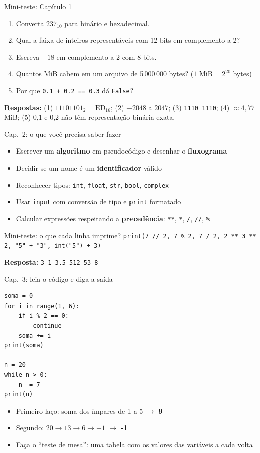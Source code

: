 \documentclass[aspectratio=169,10pt,t]{beamer}
\begin{document}
\begin{frame}{Mini-teste: Capítulo 1}
  \begin{enumerate}
    \item Converta \(237_{10}\) para binário e hexadecimal.
    \item Qual a faixa de inteiros representáveis com 12 bits em complemento a 2?
    \item Escreva \(-18\) em complemento a 2 com 8 bits.
    \item Quantos MiB cabem em um arquivo de 5\,000\,000 bytes? (\(1\text{ MiB}=2^{20}\) bytes)
    \item Por que \texttt{0.1 + 0.2 == 0.3} dá \texttt{False}?
  \end{enumerate}
  \vspace{1ex}
  \small\textbf{Respostas:} (1) \(11101101_2=\text{ED}_{16}\); (2) \(-2048\) a \(2047\); (3) \texttt{1110 1110}; (4) \(\approx 4{,}77\) MiB; (5) 0,1 e 0,2 não têm representação binária exata.
\end{frame}

\begin{frame}{Cap.~2: o que você precisa saber fazer}
  \begin{itemize}
    \item Escrever um \textbf{algoritmo} em pseudocódigo e desenhar o \textbf{fluxograma}
    \item Decidir se um nome é um \textbf{identificador} válido
    \item Reconhecer tipos: \texttt{int}, \texttt{float}, \texttt{str}, \texttt{bool}, \texttt{complex}
    \item Usar \texttt{input} com conversão de tipo e \texttt{print} formatado
    \item Calcular expressões respeitando a \textbf{precedência}: \texttt{**}, \texttt{*}, \texttt{/}, \texttt{//}, \texttt{\%}
  \end{itemize}
  \begin{block}{Mini-teste: o que cada linha imprime?}
    \texttt{print(7 // 2, 7 \% 2, 7 / 2, 2 ** 3 ** 2, "5" + "3", int("5") + 3)}
  \end{block}
  \small \textbf{Resposta:} \texttt{3 1 3.5 512 53 8}
\end{frame}

\begin{frame}[fragile]{Cap.~3: leia o código e diga a saída}
\begin{lstlisting}
soma = 0
for i in range(1, 6):
    if i % 2 == 0:
        continue
    soma += i
print(soma)

n = 20
while n > 0:
    n -= 7
print(n)
\end{lstlisting}
  \begin{itemize}
    \item Primeiro laço: soma dos ímpares de 1 a 5 \(\to\) \textbf{9}
    \item Segundo: \(20\to13\to6\to-1\) \(\to\) \textbf{-1}
    \item Faça o ``teste de mesa'': uma tabela com os valores das variáveis a cada volta
  \end{itemize}
\end{frame}
\end{document}
